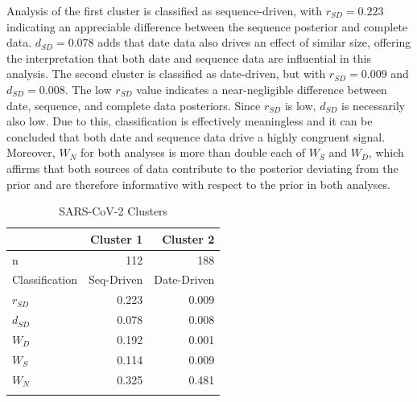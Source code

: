 \documentclass{article}
\begin{document}
Analysis of the first cluster is classified as sequence-driven, with $r_{SD} = 0.223$ indicating an appreciable difference between the sequence posterior and complete data. $d_{SD} = 0.078$ adds that date data also drives an effect of similar size, offering the interpretation that both date and sequence data are influential in this analysis. The second cluster is  classified as date-driven, but with $r_{SD} = 0.009$ and $d_{SD}=0.008$. The low $r_{SD}$ value indicates a near-negligible difference between date, sequence, and complete data posteriors. Since $r_{SD}$ is low, $d_{SD}$ is necessarily also low. Due to this, classification is effectively meaningless and it can be concluded that both date and sequence data drive a highly congruent signal. Moreover, $W_N$ for both analyses is more than double each of $W_S$ and $W_D$, which affirms that both sources of data contribute to the posterior deviating from the prior and are therefore informative with respect to the prior in both analyses.

\begin{table}[H]
\centering
\caption{SARS-CoV-2 Clusters}
\begin{tabular}{lrr}
\midrule
                    &   Cluster 1      &   Cluster 2     \\
\midrule
n                   &   112             &   188             \\
Classification      &   Seq-Driven       &   Date-Driven    \\
$r_{SD}$          &   0.223            &   0.009          \\
$d_{SD}$          &   0.078           &   0.008          \\
$W_{D}$             &   0.192            &   0.001          \\
$W_{S}$             &   0.114            &   0.009          \\
$W_{N}$             &   0.325            &   0.481          \\
\bottomrule 
\label{tab:covidTab}
\end{tabular}
\end{table}
\end{document}
